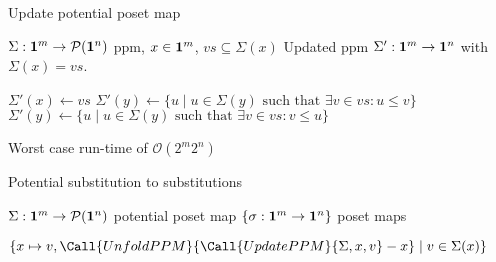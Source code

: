 








\begin{algorithm}[H]
  \caption{Update potential poset map}\label{alg:updateppm}
  \begin{algorithmic}
    \Require $\Sigma : \mathbf{1}^{m} \to \mathcal{P}({\mathbf{1}^{n}})$ ppm, $x \in
    \mathbf{1}^{m}$, $vs \subseteq \Sigma(x)$ %
    \Ensure Updated ppm $\Sigma' : \mathbf{1}^{m} \to \mathbf{1}^{n}$ with $\Sigma(x) = vs$.

    \State $\Sigma'(x) \gets vs$
    \State $\Sigma'(y) \gets \{ u \mid u \in \Sigma(y) \text{ such that } \exists
    v \in vs : u \leq v \} $
    \State $\Sigma'(y) \gets \{ u \mid u \in \Sigma(y) \text{ such that } \exists
    v \in vs : v \leq u \} $
    \EndIf
    \EndFor
    \State {}
    \EndProcedure
  \end{algorithmic}
\end{algorithm}

Worst case run-time of $\mathcal{O}(2^m 2^n)$


\begin{algorithm}[H]
  \caption{Potential substitution to substitutions}\label{alg:getsubsts}
  \begin{algorithmic}
    \Require $\Sigma : \mathbf{1}^{m} \to \mathcal{P}({\mathbf{1}^{n}})$ potential poset map
    \Ensure $\{ \sigma : \mathbf{1}^{m} \to \mathbf{1}^{n} \}$ poset maps

    \State \Return $\{ x \mapsto v, \Call{UnfoldPPM}{\Call{UpdatePPM}{\Sigma,x,v} - x} \mid v \in \Sigma(x) \}$
    \EndProcedure
  \end{algorithmic}
\end{algorithm}

